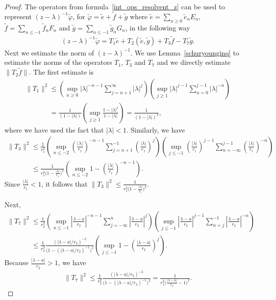 \begin{proof}
The operators from formula~\eqref{int_ops_resolvent_z} can be used to represent $(z-\lambda)^{-1}\tilde{\varphi}$, for
$\tilde{\varphi}=\tilde{e}+\tilde{f}+\tilde{g}$ where $\tilde{e}=\sum\limits_{n\ge0}\tilde{e}_nE_n$,
$\tilde{f}=\sum\limits_{n\le -1}\tilde{f}_nF_n$ and $\tilde{g}=\sum\limits_{n\le -1}\tilde{g}_nG_n$, in the following way
\begin{gather*}
(z-\lambda)^{-1}\tilde{\varphi}=T_1\tilde{e}+T_2(\tilde{e},\tilde{g})+T_3\tilde{f}-T_7\tilde{g}.
\end{gather*}
Next we estimate the norm of $(z-\lambda)^{-1}$.
We use Lemma~\ref{schuryounginq} to estimate the norms of the operators $T_1$, $T_3$ and $T_7$ and we directly estimate
$\|T_2\tilde{f}\|$.
The f\/irst estimate is
\begin{gather*}
\|T_1\|^2
\leq \left(\sup_{n \geq 0} |\lambda|^{-n-1} \sum\limits_{j=n+1}^{\infty}|\lambda|^j \right)\left(\sup_{j \geq 1} |\lambda|^{j-1}
\sum\limits_{n=0}^{j-1}|\lambda|^{-n} \right)
\\
\phantom{\|T_1\|^2}{}
=\frac 1{\left(1-|\lambda|\right)}\left(\sup_{j \geq 1} \frac{1-|\lambda|^j}{1-|\lambda|} \right)=\frac1{\left(1-|\lambda|\right)^2},
\end{gather*}
where we have used the fact that $|\lambda|<1$.
Similarly, we have
\begin{gather*}
\|T_3\|^2
\leq \frac 1{r_1^2}\left(\sup_{n \leq -2} \left(\frac{|\lambda|}{r_1}\right)^{-n-1}
\sum\limits_{j=n+1}^{-1}\left(\frac{|\lambda|}{r_1}\right)^j \right) \left(\sup_{j \leq -1}
\left(\frac{|\lambda|}{r_1}\right)^{j-1} \sum\limits_{n=-\infty}^{j-1}\left(\frac{|\lambda|}{r_1}\right)^{-n} \right)
\\
\phantom{\|T_3\|^2}{}
  \leq \frac 1{r_1^2 \big(1- \frac{|\lambda|}{r_1}\big)^2} \left(\sup_{n\leq -2}
1-\left(\frac{|\lambda|}{r_1}\right)^{-n-1}\right).
\end{gather*}
Since $\frac{|\lambda|}{r_1} <1$, it follows that $\|T_3\|^2 \leq \frac{1}{r_1^2\big(1- \frac{|\lambda|}{r_1}\big)^2}$.

Next,
\begin{gather*}
\|T_7\|^2  \leq \frac 1{r_2^2} \left(\sup_{n \leq -1} \left|\frac{\lambda -a}{r_2} \right|^{-n-1}
\sum\limits_{j=-\infty}^n \left|\frac{\lambda -a}{r_2} \right|^j \right) \left(\sup_{j \leq -1} \left|\frac{\lambda
-a}{r_2} \right|^{j-1} \sum\limits_{n=j}^{-1} \left|\frac{\lambda -a}{r_2} \right|^{-n} \right)
\\
\phantom{\|T_7\|^2}{}
  \leq \frac 1{r_2^2} \frac{(|\lambda -a|/ r_2)^{-2}}{\big(1- (|\lambda -a|/ r_2)^{-1}\big)^2} \left(\sup_{j \leq -1} 1-
\left(\frac{|\lambda -a|}{r_2}\right)^j\right).
\end{gather*}
Because $\frac{|\lambda -a|}{r_2}>1$, we have
\begin{gather*}
\|T_7\|^2 \leq \frac 1{r_2^2} \frac{(|\lambda -a|/ r_2)^{-2}}{\big(1- (|\lambda -a|/ r_2)^{-1}\big)^2}=\frac {1}{r_1^2
\big(\frac{|\lambda -a|}{r_2} -1\big)^2}.
\end{gather*}


\end{proof}
